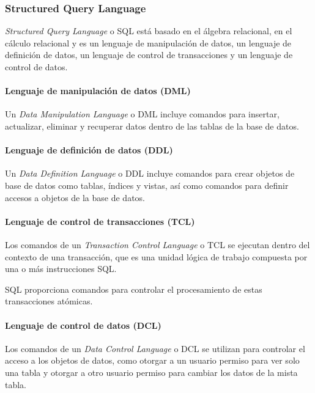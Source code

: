 \subsubsection{Structured Query Language}
\textit{Structured Query Language} o SQL está basado en el álgebra relacional, en el cálculo relacional y es un lenguaje de manipulación de datos, un lenguaje de definición de datos, un lenguaje de control de transacciones y un lenguaje de control de datos.

\paragraph*{Lenguaje de manipulación de datos (DML)}
Un \textit{Data Manipulation Language} o DML incluye comandos para insertar, actualizar, eliminar y recuperar datos dentro de las tablas de la base de datos. 

\paragraph*{Lenguaje de definición de datos (DDL)}
 Un \textit{Data Definition Language} o DDL incluye comandos para crear objetos de base de datos como tablas, índices y vistas, así como comandos para definir accesos a objetos de la base de datos. 

\paragraph*{Lenguaje de control de transacciones (TCL)}
Los comandos de un \textit{Transaction Control Language} o TCL se ejecutan dentro del contexto de una transacción, que es una unidad lógica de trabajo compuesta por una o más instrucciones SQL. 


SQL proporciona comandos para controlar el procesamiento de estas transacciones atómicas.

\paragraph*{Lenguaje de control de datos (DCL)}
Los comandos de un \textit{Data Control Language} o DCL se utilizan para controlar el acceso a los objetos de datos, como otorgar a un usuario permiso para ver solo una tabla y otorgar a otro usuario permiso para cambiar los datos de la mista tabla.


